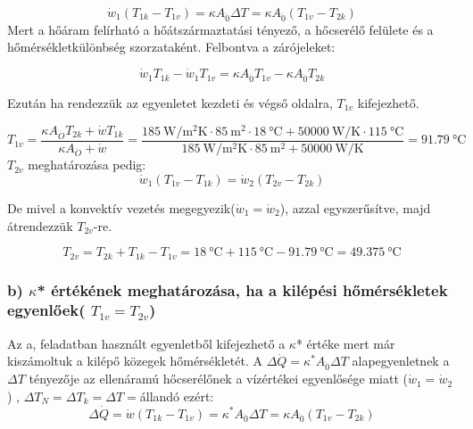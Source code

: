 \begin{equation}
  \dot{w}_1\left(T_{1k} - T_{1v}\right) = \kappa A_{\ddot{0}} \Delta T = \kappa A_{\ddot{0}} \left(T_{1v} - T_{2k}\right)
 \end{equation}
Mert a hőáram felírható a hőátszármaztatási tényező, a hőcserélő felülete és a hőmérsékletkülönbség szorzataként.
Felbontva a zárójeleket:

 \begin{equation}
\dot{w}_1 T_{1k} - \dot{w}_1 T_{1v} =  \kappa A_{\ddot{0}} T_{1v} -  \kappa A_{\ddot{0}} T_{2k}
 \end{equation}


Ezután ha rendezzük az egyenletet kezdeti és végső oldalra, $T_{1v}$ kifejezhető.

\begin{equation}
T_{1v} = \frac{\kappa A_{\ddot{O}} T_{2k} + \dot{w} T_{1k}}{\kappa A_{\ddot{O}} + \dot{w}} =\frac{\SI{185}{\watt\per\meter\squared\kelvin}\cdot \SI{85}{\meter\squared}\cdot \SI{18}{\celsius} + \SI{50000}{\watt\per\kelvin} \cdot \SI{115}{\celsius}}{\SI{185}{\watt\per\meter\squared\kelvin}\cdot \SI{85}{\meter\squared} + \SI{50000}{\watt\per\kelvin}}= \SI{91.79}{\celsius}
\end{equation}
$T_{2v}$ meghatározása pedig:
\begin{equation}
\dot{w}_1\left(T_{1v} - T_{1k}\right) = \dot{w}_2\left(T_{2v} - T_{2k}\right)
\end{equation}

De mivel a konvektív vezetés megegyezik($\dot{w}_1 = \dot{w}_2$), azzal egyszerűsítve, majd átrendezzük $T_{2v}$-re.

\begin{equation}
T_{2v} = T_{2k} + T_{1k} - T_{1v} = \SI{18}{\celsius} + \SI{115}{\celsius} - \SI{91.79}{\celsius} = \SI{49.375}{\celsius}
\end{equation}

\subsubsection*{b) $\kappa$* értékének meghatározása, ha a kilépési hőmérsékletek egyenlőek( $T_{1v} = T_{2v}$) }
Az a, feladatban használt egyenletből kifejezhető a $\kappa$* értéke mert már kiszámoltuk a kilépő közegek hőmérsékletét. A $\Delta \dot{Q}= \kappa^* A_{\ddot{0}} \Delta T$ alapegyenletnek a $\Delta T$ tényezője az ellenáramú hőcserélőnek a vízértékei egyenlősége miatt ($\dot{w}_1 = \dot{w}_2$) ,  $\Delta T_N = \Delta T_k = \Delta T = $állandó ezért:
\vspace{1mm}
\begin{equation}
\Delta \dot{Q}=\dot{w}\left(T_{1k} - T_{1v}\right) = \kappa^* A_{\ddot{0}} \Delta T = \kappa A_{\ddot{0}} \left(T_{1v} - T_{2k}\right)
\end{equation}


